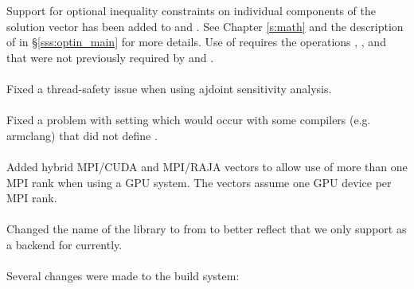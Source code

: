 Support for optional inequality constraints on individual components of the
solution vector has been added to {\cvode} and {\cvodes}. See Chapter
\ref{s:math} and the description of  in
\S\ref{sss:optin_main} for more details. Use of 
requires the {\nvector} operations , , and
 that were not previously required by {\cvode} and {\cvodes}.
\\
\\
\noindent Fixed a thread-safety issue when using ajdoint sensitivity analysis.
\\
\\
\noindent Fixed a problem with setting  which would occur
with some compilers (e.g. armclang) that did not define .
\\
\\
\noindent Added hybrid MPI/CUDA and MPI/RAJA vectors to allow use of more
than one MPI rank when using a GPU system.  The vectors assume one GPU
device per MPI rank.
\\
\\
\noindent Changed the name of the {\raja} {\nvector} library to
 from \newline
{} to better reflect that we only support {\cuda}
as a backend for {\raja} currently.
\\
\\
\noindent Several changes were made to the build system:
